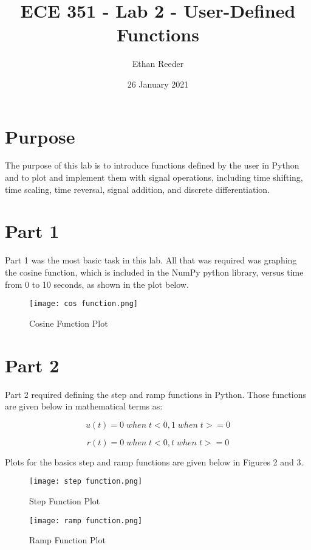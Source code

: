 \documentclass[12pt]{article}
\title{ECE 351 - Lab 2 - User-Defined Functions}
\author{Ethan Reeder}
\date{26 January 2021}
\begin{document}
\lstset{language=C}

\maketitle

\newpage

\tableofcontents

\newpage

\section{Purpose}

The purpose of this lab is to introduce functions defined by the user in Python and to plot and implement them with signal operations, including time shifting, time scaling, time reversal, signal addition, and discrete differentiation.

\section{Part 1}

Part 1 was the most basic task in this lab. All that was required was graphing the cosine function, which is included in the NumPy python library, versus time from 0 to 10 seconds, as shown in the plot below.

\begin{figure}[h!]
    \centering
    \texttt{[image: cos function.png]}
    \caption{Cosine Function Plot}
\end{figure}

\section{Part 2}

Part 2 required defining the step and ramp functions in Python. Those functions are given below in mathematical terms as:

$$ u(t) =   0 \; when \; t < 0, 1 \; when \; t >= 0 $$

$$ r(t) =   0 \; when \; t < 0, t \; when \; t >= 0 $$

Plots for the basics step and ramp functions are given below in Figures 2 and 3.

\begin{figure}[h!]
    \centering
    \texttt{[image: step function.png]}
    \caption{Step Function Plot}
\end{figure}

\begin{figure}[h!]
    \centering
    \texttt{[image: ramp function.png]}
    \caption{Ramp Function Plot}
\end{figure}
\end{document}
